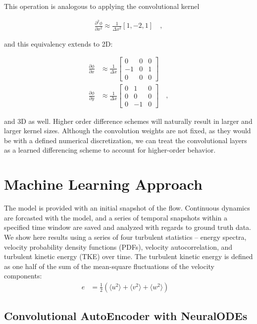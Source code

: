 \documentclass[book.tex]{subfiles}
\begin{document}
This operation is analogous to applying the convolutional kernel

\begin{align}
\frac{\partial^2 \phi}{\partial x^2} \approx \frac{1}{\Delta x^2} [1,-2,1] \quad ,
\end{align}

and this equivalency extends to 2D:

\begin{align*}
\frac{\partial \phi}{\partial x} &\approx \frac{1}{\Delta x} \begin{bmatrix}
0 & 0 & 0\\
-1 & 0 & 1\\
0 & 0 & 0
\end{bmatrix} \\
\frac{\partial \phi}{\partial y} &\approx \frac{1}{\Delta x} \begin{bmatrix}
0 & 1 & 0\\
0 & 0 & 0\\
0 & -1 & 0
\end{bmatrix}
\quad ,
\end{align*}


\noindent and 3D as well. Higher order difference schemes will naturally result in larger and larger kernel sizes. Although the convolution weights are not fixed, as they would be with a defined numerical discretization, we can treat the convolutional layers as a learned differencing scheme to account for higher-order behavior.

\section{Machine Learning Approach}

The model is provided with an initial snapshot of the flow. Continuous dynamics are forcasted with the model, and a series of temporal snapshots within a specified time window are saved and analyzed with regards to ground truth data.  We show here results using a series of four turbulent statistics – energy spectra, velocity probability density functions (PDFs), velocity autocorrelation, and turbulent kinetic energy (TKE) over time. The turbulent kinetic energy is defined as one half of the sum of the mean-square fluctuations of the velocity components:
\begin{align}
e &= \frac{1}{2}(\langle u^2\rangle+\langle v^2\rangle+\langle w^2\rangle) \quad 
\label{eq:tke}
\end{align}

\subsection{Convolutional AutoEncoder with NeuralODEs}
\end{document}
